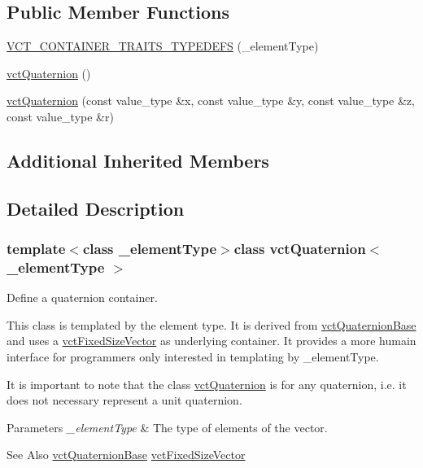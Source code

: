 \subsection*{Public Member Functions}
\begin{DoxyCompactItemize}
\item 
\hyperlink{classvct_quaternion_a8c9965ff5b6602b3d068797fe456dc78}{V\-C\-T\-\_\-\-C\-O\-N\-T\-A\-I\-N\-E\-R\-\_\-\-T\-R\-A\-I\-T\-S\-\_\-\-T\-Y\-P\-E\-D\-E\-F\-S} (\-\_\-element\-Type)
\item 
\hyperlink{classvct_quaternion_a2c37773efff24117e5209fa58dce02f4}{vct\-Quaternion} ()
\item 
\hyperlink{classvct_quaternion_a6987919ed544903ff0f3d075738d4908}{vct\-Quaternion} (const value\-\_\-type \&x, const value\-\_\-type \&y, const value\-\_\-type \&z, const value\-\_\-type \&r)
\end{DoxyCompactItemize}
\subsection*{Additional Inherited Members}


\subsection{Detailed Description}
\subsubsection*{template$<$class \-\_\-element\-Type$>$class vct\-Quaternion$<$ \-\_\-element\-Type $>$}

Define a quaternion container. 

This class is templated by the element type. It is derived from \hyperlink{classvct_quaternion_base}{vct\-Quaternion\-Base} and uses a \hyperlink{classvct_fixed_size_vector}{vct\-Fixed\-Size\-Vector} as underlying container. It provides a more humain interface for programmers only interested in templating by \-\_\-element\-Type.

It is important to note that the class \hyperlink{classvct_quaternion}{vct\-Quaternion} is for any quaternion, i.\-e. it does not necessary represent a unit quaternion.


\begin{DoxyParams}{Parameters}
{\em \-\_\-element\-Type} & The type of elements of the vector.\\
\hline
\end{DoxyParams}
\begin{DoxySeeAlso}{See Also}
\hyperlink{classvct_quaternion_base}{vct\-Quaternion\-Base} \hyperlink{classvct_fixed_size_vector}{vct\-Fixed\-Size\-Vector} 
\end{DoxySeeAlso}


